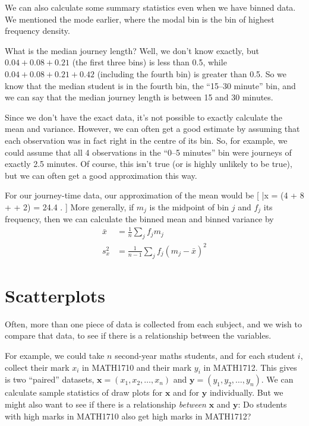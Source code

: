 \documentclass[
  letterpaper,
  DIV=11,
  numbers=noendperiod]{scrreprt}
\theoremstyle{remark}
\begin{document}
We can also calculate some summary statistics even when we have binned
data. We mentioned the mode earlier, where the modal bin is the bin of
highest frequency density.

What is the median journey length? Well, we don't know exactly, but
\(0.04 + 0.08 + 0.21\) (the first three bins) is less than 0.5, while
\(0.04 + 0.08 + 0.21 + 0.42\) (including the fourth bin) is greater than
0.5. So we know that the median student is in the fourth bin, the
``15--30 minute'' bin, and we can say that the median journey length is
between 15 and 30 minutes.

Since we don't have the exact data, it's not possible to exactly
calculate the mean and variance. However, we can often get a good
estimate by assuming that each observation was in fact right in the
centre of its bin. So, for example, we could assume that all 4
observations in the ``0--5 minutes'' bin were journeys of exactly 2.5
minutes. Of course, this isn't true (or is highly unlikely to be true),
but we can often get a good approximation this way.

For our journey-time data, our approximation of the mean would be {[}
\bar x =  \big(4 + 8  + \cdots +
2) = 24.4 . {]} More generally, if \(m_j\) is the midpoint of
bin \(j\) and \(f_j\) its frequency, then we can calculate the binned
mean and binned variance by \begin{align*}
  \bar x &= \frac{1}{n} \sum_j f_j m_j \\
  s^2_x  &= \frac{1}{n-1} \sum_j f_j (m_j - \bar x)^2
\end{align*}

\hypertarget{scatterplots}{%
\section{Scatterplots}\label{scatterplots}}

Often, more than one piece of data is collected from each subject, and
we wish to compare that data, to see if there is a relationship between
the variables.

For example, we could take \(n\) second-year maths students, and for
each student \(i\), collect their mark \(x_i\) in MATH1710 and their
mark \(y_i\) in MATH1712. This gives is two ``paired'' datasets,
\(\mathbf x = (x_1, x_2, \dots, x_n)\) and
\(\mathbf y = (y_1, y_2, \dots, y_n)\). We can calculate sample
statistics of draw plots for \(\mathbf x\) and for \(\mathbf y\)
individually. But we might also want to see if there is a relationship
\emph{between} \(\mathbf x\) and \(\mathbf y\): Do students with high
marks in MATH1710 also get high marks in MATH1712?
\end{document}
